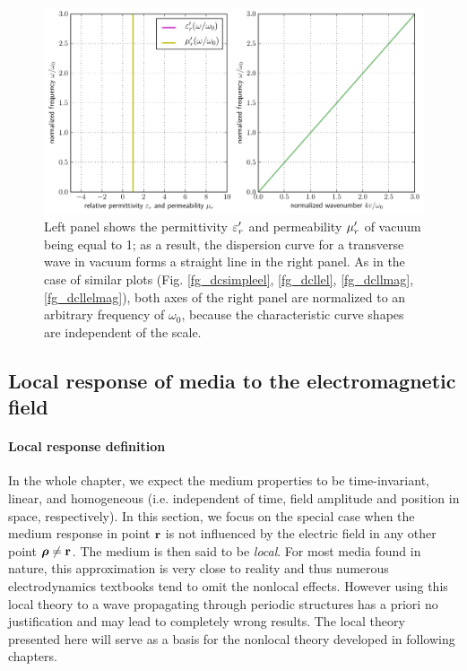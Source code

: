 \begin{figure}[t] \caption{Left panel shows the permittivity $\varepsilon_r'$ and permeability $\mu_r'$ of vacuum being equal to 1; as a result, the dispersion curve for a transverse wave in vacuum forms a straight line in the right panel. As in the case of similar plots (Fig. \ref{fg_dcsimpleel}, \ref{fg_dcllel}, \ref{fg_dcllmag}, \ref{fg_dcllelmag}), both axes of the right panel are normalized to an arbitrary frequency of $\omega_0$, because the characteristic curve shapes are independent of the scale.} \label{fg_dcvac} \centering  %
	\includegraphics[width=17cm]{img/dispersion_landau_lifshitz/dispersion_vacuum.pdf}
\end{figure}

\subsection{Local response of media to the electromagnetic field} \label{loc_response_of_media}
\paragraph{Local response definition} \label{subsection_local_resp} %
In the whole chapter, we expect the medium properties to be time-invariant, linear, and homogeneous (i.e. independent of time, field amplitude and position in space, respectively). 
In this section, we focus on the special case when the medium response in point ${\mathbf{r}}$ is not influenced by the electric field in any other point $\boldsymbol{\rho} \neq {\mathbf{r}}$. The medium is then said to be \textit{local}. 
For most media found in nature, this approximation is very close to reality and thus numerous electrodynamics textbooks tend to omit the nonlocal effects. 
However using this local theory to a wave propagating through periodic structures has a priori no justification and may lead to completely wrong results. The local theory presented here will serve as a basis for the nonlocal theory developed in following chapters.

